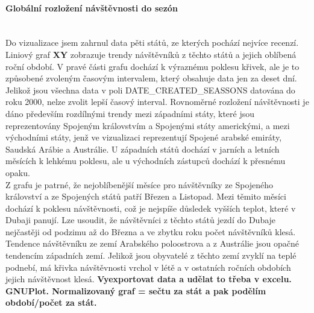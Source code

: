 \documentclass[czech,BP]{thesiskiv}
\begin{document}
\paragraph{Globální rozložení návštěvnosti do sezón}\mbox{}\\
Do vizualizace jsem zahrnul data pěti států, ze kterých pochází nejvíce recenzí. Liniový graf \textbf{XY} zobrazuje trendy návštěvníků z těchto států a jejich oblíbená roční období. V pravé části grafu dochází k výraznému poklesu křivek, ale je to způsobené zvoleným časovým intervalem, který obsahuje data jen za deset dní. Jelikož jsou všechna data v poli DATE\_CREATED\_SEASSONS datována do roku 2000, nelze zvolit lepší časový interval. Rovnoměrné rozložení návštěvnosti je dáno především rozdílnými trendy mezi západními státy, které jsou reprezentovány Spojeným královstvím a Spojenými státy americkými, a mezi východními státy, jenž ve vizualizaci reprezentují Spojené arabské emiráty, Saudská Arábie a Austrálie. U západních států dochází v jarních a letních měsících k lehkému poklesu, ale u východních zástupců dochází k přesnému opaku.
\\
Z grafu je patrné, že nejoblíbenější měsíce pro návštěvníky ze Spojeného království a ze Spojených států patří Březen a Listopad. Mezi těmito měsíci dochází k poklesu návštěvnosti, což je nejspíše důsledek vyšších teplot, které v Dubaji panují. Lze usoudit, že návštěvníci z těchto států jezdí do Dubaje nejčastěji od podzimu až do Března a ve zbytku roku počet návštěvníků klesá.
\\
Tendence návštěvníku ze zemí Arabského poloostrova a z Austrálie jsou opačné tendencím západních zemí. Jelikož jsou obyvatelé z těchto zemí zvyklí na teplé podnebí, má křivka návštěvnosti vrchol v létě a v ostatních ročních obdobích jejich návštěvnost klesá.
\textbf{Vyexportovat data a udělat to třeba v excelu. GNUPlot. Normalizovaný graf = sečtu za stát a pak podělím období/počet za stát.}
\end{document}
